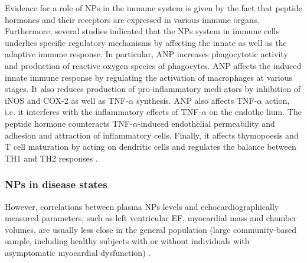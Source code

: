 \documentclass[14pt,a4paper,onecolumn]{extarticle}
\begin{document}
Evidence for a role of NPs in the immune system is given by the fact that peptide hormones and their receptors are expressed in various immune organs. Furthermore, several studies indicated that the NPs system in immune cells underlies specific regulatory mechanisms by affecting the innate as well as the adaptive immune response. In particular, ANP increases phagocytotic activity and production of reactive oxygen species of phagocytes. ANP affects the induced innate immune response by regulating the activation of macrophages at various stages. It also reduces production of pro-inflammatory medi ators by inhibition of iNOS and COX-2 as well as TNF-$\alpha$ synthesis. ANP also affects TNF-$\alpha$ action, i.e. it interferes with the inflammatory effects of TNF-$\alpha$ on the endothe lium. The peptide hormone counteracts TNF-$\alpha$-induced endothelial permeability and adhesion and attraction of inflammatory cells. Finally, it affects thymopoesis and T cell maturation by acting on dendritic cells and regulates the balance between TH1 and TH2 responses \citep{99}. %




\subsubsection{NPs in disease states}

However, correlations between plasma NPs levels and echocardiographically measured parameters, such as left ventricular EF, myocardial mass and chamber volumes, are usually less close in the general population (large community-based sample, including healthy subjects with or without individuals with asymptomatic myocardial dysfunction) \citep{bib38} \citep{bib39} \citep{bib366} \citep{bib367}. %
\end{document}
